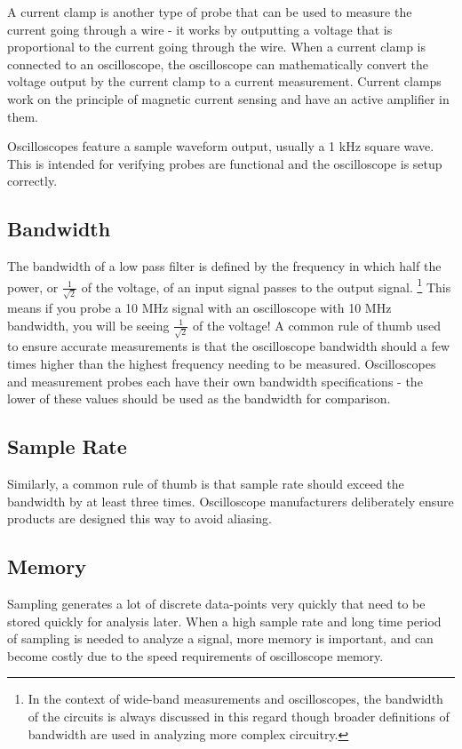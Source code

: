 \documentclass[main.tex]{subfiles}
\begin{document}
\newnoindentpara A current clamp is another type of probe that can be used to measure the current going through a wire - it works by outputting a voltage that is proportional to the current going through the wire. When a current clamp is connected to an oscilloscope, the oscilloscope can mathematically convert the voltage output by the current clamp to a current measurement. Current clamps work on the principle of magnetic current sensing and have an active amplifier in them.

Oscilloscopes feature a sample waveform output, usually a 1 kHz square wave. This is intended for verifying probes are functional and the oscilloscope is setup correctly. %

\subsection{Bandwidth}
The bandwidth of a low pass filter is defined by the frequency in which half the power, or $\frac{1}{\sqrt{2}}$ of the voltage, of an input signal passes to the output signal. \footnote{In the context of wide-band measurements and oscilloscopes, the bandwidth of the circuits is always discussed in this regard though broader definitions of bandwidth are used in analyzing more complex circuitry.}
This means if you probe a 10 MHz signal with an oscilloscope with 10 MHz bandwidth, you will be seeing $\frac{1}{\sqrt{2}}$ of the voltage! A common rule of thumb used to ensure accurate measurements is that the oscilloscope bandwidth should a few times higher than the highest frequency needing to be measured. Oscilloscopes and measurement probes each have their own bandwidth specifications - the lower of these values should be used as the bandwidth for comparison. \newline

\subsection{Sample Rate}
\newnoindentpara Similarly, a common rule of thumb is that sample rate should exceed the bandwidth by at least three times. Oscilloscope manufacturers deliberately ensure products are designed this way to avoid aliasing. 

\subsection{Memory}
Sampling generates a lot of discrete data-points very quickly that need to be stored quickly for analysis later. When a high sample rate and long time period of sampling is needed to analyze a signal, more memory is important, and can become costly due to the speed requirements of oscilloscope memory.
\end{document}
